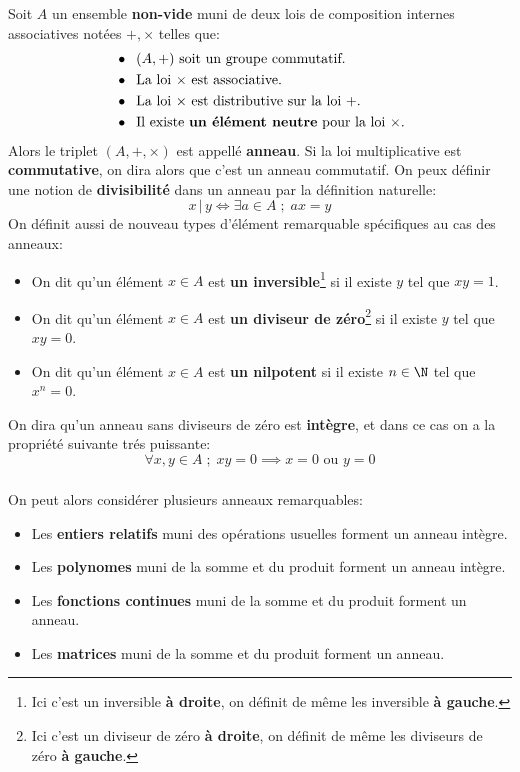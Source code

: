 \chapter*{}
Soit \(A\) un ensemble \textbf{non-vide} muni de deux lois de composition internes associatives notées \(+, \times\) telles que:
\begin{align*}
   &\bullet \;\; (A, +) \text{ soit un groupe commutatif.} \\
   &\bullet \;\; \text{La loi \(\times\) est associative.}\\
   &\bullet \;\; \text{La loi \(\times\) est distributive sur la loi \(+\).}\\
   &\bullet \;\; \text{Il existe \textbf{un élément neutre} pour la loi \(\times\).}
\end{align*}
Alors le triplet \((A, +, \times)\) est appellé \textbf{anneau}. Si la loi multiplicative est \textbf{commutative}, on dira alors que c'est un anneau commutatif. On peux définir une notion de \textbf{divisibilité} dans un anneau par la définition naturelle:
\[ 
   x \, \big| \, y \iff \exists a \in A \; ; \; ax = y
\]
On définit aussi de nouveau types d'élément remarquable spécifiques au cas des anneaux:
\begin{itemize}
   \item On dit qu'un élément \(x \in A\) est \textbf{un inversible}\footnote[1]{Ici c'est un inversible \textbf{à droite}, on définit de même les inversible \textbf{à gauche}.} si il existe \( y \) tel que \( xy = 1 \).
   \item On dit qu'un élément \(x \in A\) est \textbf{un diviseur de zéro}\footnote[2]{Ici c'est un diviseur de zéro \textbf{à droite}, on définit de même les diviseurs de zéro \textbf{à gauche}.} si il existe \( y \) tel que \( xy = 0 \).
   \item On dit qu'un élément \(x \in A\) est \textbf{un nilpotent} si il existe \( n \in \N \) tel que \(x^n = 0\).
\end{itemize}
On dira qu'un anneau sans diviseurs de zéro est \textbf{intègre}, et dans ce cas on a la propriété suivante trés puissante:
\[ 
   \forall x, y \in A \; ; \; xy = 0 \implies x = 0 \text{ ou } y = 0 
\]
\subsection*{}
On peut alors considérer plusieurs anneaux remarquables:
\begin{itemize}
   \item Les \textbf{entiers relatifs} muni des opérations usuelles forment un anneau intègre.
   \item Les \textbf{polynomes} muni de la somme et du produit forment un anneau intègre.
   \item Les \textbf{fonctions continues} muni de la somme et du produit forment un anneau.
   \item Les \textbf{matrices} muni de la somme et du produit forment un anneau.
\end{itemize}
